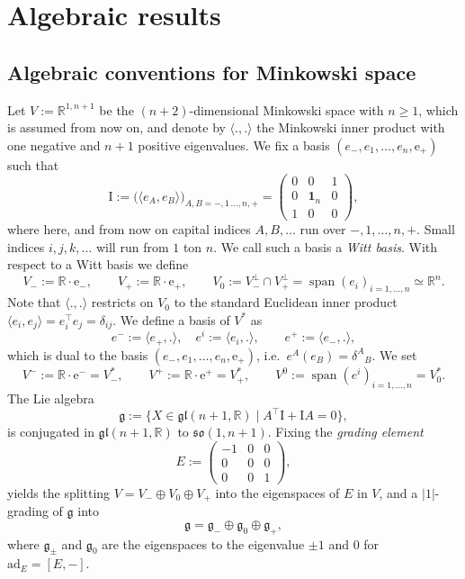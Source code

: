 \documentclass[11pt,a4paper]{amsart}
\DeclareMathOperator{\Span}{span}
\newcommand{\g}{\mathfrak{g}}
\newcommand{\+}{\oplus}
\newcommand{\so}{\mathfrak{so}}
\newcommand{\gl}{\mathfrak{gl}}
\newcommand{\I}{\mathrm{I}}
\newcommand{\1}{\mathbf{1}}
\newcommand{\e}{\mathrm{e}}
\newcommand{\R}{\mathbb{R}} %
\newcommand{\<}{\langle}
\renewcommand{\>}{\rangle}
\theoremstyle{definition}
\theoremstyle{plain}
\numberwithin{equation}{section}
\begin{document}
\section{Algebraic results}\label{algsec}

\subsection{Algebraic conventions for Minkowski space}
\label{algsec1}
Let $V:=\R^{1,n+1}$ be the $(n+2)$-dimensional Minkowski space with $n\ge 1$, which is assumed from now on,  and denote by $\<.,.\>$  the Minkowski inner product with one negative and $n+1$ positive eigenvalues. We fix a basis $(e_-, e_1, \ldots, e_n, \e_+)$ such that 
\[\I:=\big(\< e_A,e_B\> \big)_{A,B=-, 1\,\ldots, n, +}=\begin{pmatrix} 0&0&1\\ 0&\1_n&0\\1&0&0\end{pmatrix},\]
where here, and from now on capital indices $A,B,\ldots$ run over $-, 1, \ldots, n, +$. Small indices $i,j,k,\ldots$ will run from $1$ ton $n$. 
We call such a basis a {\em Witt basis}. With respect to a Witt basis
we define 
\[V_-:=\R\cdot \e_-,\qquad V_+:=\R\cdot \e_+ ,\qquad V_0:=V_-^\perp\cap V_+^\perp=\Span(e_i)_{i=1,\ldots, n}\simeq \R^n.\]
Note that $\<.,.\> $ restricts on $V_0$ to the standard Euclidean inner product $\<e_i,e_j\>=e_i^\top e_j=\delta_{ij}$. 
We  define a basis of $V^*$ as
\[e^-:=\<e_+,.\>, \quad e^i:=\<e_i,.\>,\qquad e^+:=\<e_-,.\>,\]
which is dual to the basis $(e_-, e_1, \ldots, e_n, \e_+)$, i.e.~$e^A(e_B)=\delta^A{}_B$.
We set
\[V^-:=\R\cdot \e^-=V_-^*,\qquad V^+:=\R\cdot \e^+=V_+^* ,\qquad V^0:=\Span(e^i)_{i=1,\ldots, n}=V_0^*.\]
The Lie algebra
\[\g:=\{X\in \gl(n+1,\R)\mid A^\top \I+\I A=0\},\]
is conjugated in  $\gl(n+1,\R)$ to $\so(1,n+1)$. Fixing the {\em grading element}
\[E:=\begin{pmatrix}
-1&0&0 \\0 &0& 0\\0&0&1
\end{pmatrix},\]
yields the splitting $V=V_-\+V_0\+V_+$ into the eigenspaces of $E$ in $V$, and 
  a $|1|$-grading of $\g$ into 
\[\g=\g_-\+\g_0\+\g_+,
\]
where $\g_\pm$  and $\g_0$  are the eigenspaces to the eigenvalue $\pm1$ and $0$ for $\mathrm{ad}_E=[E, -]$.
\end{document}
